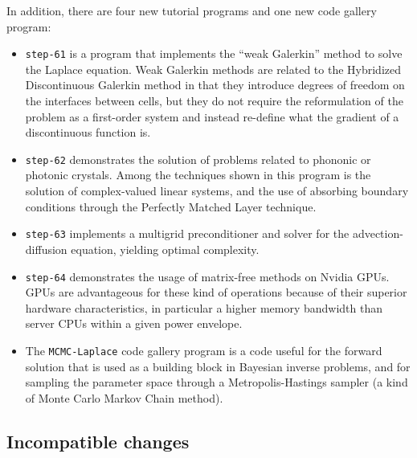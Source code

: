 \documentclass{ansarticle-preprint}
\begin{document}
In addition, there are four new tutorial programs and one new code
gallery program:
\begin{itemize}
\item \texttt{step-61} is a program that implements the ``weak
  Galerkin'' method to solve the Laplace equation. Weak Galerkin
  methods are related to the Hybridized Discontinuous Galerkin method
  in that they introduce degrees of freedom on the interfaces between
  cells, but they do not require the reformulation of the problem as a
  first-order system and instead re-define what the gradient of a
  discontinuous function is.

\item \texttt{step-62} demonstrates the solution of problems related
  to phononic or photonic crystals. Among the techniques shown in this
  program is the solution of complex-valued linear systems, and the
  use of absorbing boundary conditions through the Perfectly Matched
  Layer technique.

\item \texttt{step-63} implements a multigrid preconditioner
  and solver for the advection-diffusion equation, yielding optimal
  complexity.

\item \texttt{step-64} demonstrates the usage of matrix-free methods on Nvidia GPUs.
GPUs are advantageous for these kind of operations because of their superior
hardware characteristics, in particular a higher memory bandwidth than server
CPUs within a given power envelope.

\item The \texttt{MCMC-Laplace} code gallery program is a code useful
  for the forward solution that is used as a building block in
  Bayesian inverse problems, and for sampling the parameter space
  through a Metropolis-Hastings sampler (a kind of Monte Carlo
  Markov Chain method).
\end{itemize}


\subsection{Incompatible changes}
\end{document}
